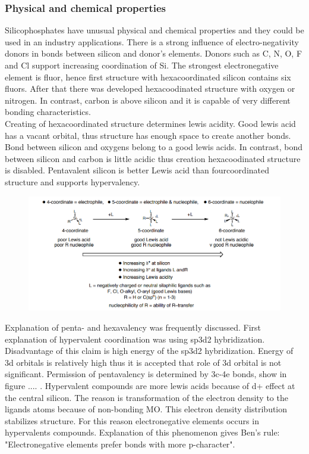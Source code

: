 \documentclass[
  digital, %
  table,   %
  lof,     %
  lot,     %
]{fithesis3}
\begin{document}
\subsubsection{Physical and chemical properties}
Silicophosphates have unusual physical and chemical properties and they could be used in an industry applications. There is a strong influence of electro-negativity donors in bonds between silicon and donor's elements.  Donors such as C, N, O, F and Cl support increasing coordination of Si. The strongest electronegative element is fluor, hence first structure with hexacoordinated silicon contains six fluors. After that there was developed hexacoodinated structure with oxygen or nitrogen. In contrast, carbon is above silicon and it is capable of very different bonding characteristics. \\
Creating of hexacoordinated structure determines lewis acidity. Good lewis acid has a vacant orbital, thus structure has enough space to create another bonds. Bond between silicon and oxygens belong to a good lewis acids. In contrast, bond between silicon and carbon is little acidic thus creation hexacoodinated structure is disabled. Pentavalent silicon is better Lewis acid than fourcoordinated structure and supports hypervalency.\cite{Wagler2014}\\

\begin{figure}[h!]
\caption{\cite{hypervalentsiliconmacmillangroup2005}}
  \center
  \includegraphics[width=12cm]{schema_silicophosphates.png}
  \label{schema_silicon_coordinate}
  \end{figure}


 Explanation of penta- and hexavalency was frequently discussed. First explanation of hypervalent coordination was using sp3d2 hybridization. Disadvantage of this claim is high energy of the sp3d2 hybridization. Energy of 3d orbitals is relatively high thus it is accepted that role of 3d orbital is not significant. Permission of pentavalency is determined by 3c-4e bonds, show in figure .... . Hypervalent compounds are more lewis acids because of d+ effect at the central silicon. The reason is transformation of the electron density to the ligands atoms because of non-bonding MO. This electron density distribution stabilizes structure. For this reason electronegative elements occurs in hypervalents compounds. Explanation of this phenomenon gives Ben's rule: "Electronegative elements prefer bonds with more p-character".\cite{hypervalentsiliconmacmillangroup2005} \\
\end{document}

